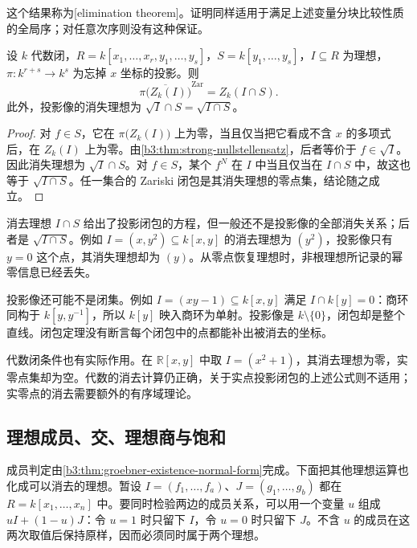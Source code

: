 这个结果称为[elimination theorem]。证明同样适用于满足上述变量分块比较性质的全局序；对任意次序则没有这种保证。

\begin{theorem}[投影的闭包]\label{b3:thm:elimination-projection-closure}
	设 \(k\) 代数闭，\(R=k[x_1,\ldots,x_r,y_1,\ldots,y_s]\)，\(S=k[y_1,\ldots,y_s]\)，\(I\subseteq R\) 为理想，\(\pi:k^{r+s}\to k^s\) 为忘掉 \(x\) 坐标的投影。则
	\[
		\overline{\pi\bigl(Z_k(I)\bigr)}^{\mathrm{Zar}}=Z_k(I\cap S).
	\]
	此外，投影像的消失理想为 \(\sqrt I\cap S=\sqrt{I\cap S}\)。
\end{theorem}
\begin{proof}
	对 \(f\in S\)，它在 \(\pi\bigl(Z_k(I)\bigr)\) 上为零，当且仅当把它看成不含 \(x\) 的多项式后，在 \(Z_k(I)\) 上为零。由\cref{b3:thm:strong-nullstellensatz}，后者等价于 \(f\in\sqrt I\)。因此消失理想为 \(\sqrt I\cap S\)。对 \(f\in S\)，某个 \(f^N\) 在 \(I\) 中当且仅当在 \(I\cap S\) 中，故这也等于 \(\sqrt{I\cap S}\)。任一集合的 Zariski 闭包是其消失理想的零点集，结论随之成立。
\end{proof}

消去理想 \(I\cap S\) 给出了投影闭包的方程，但一般还不是投影像的全部消失关系；后者是 \(\sqrt{I\cap S}\)。例如 \(I=(x,y^2)\subseteq k[x,y]\) 的消去理想为 \((y^2)\)，投影像只有 \(y=0\) 这个点，其消失理想却为 \((y)\)。从零点恢复理想时，非根理想所记录的幂零信息已经丢失。

投影像还可能不是闭集。例如 \(I=(xy-1)\subseteq k[x,y]\) 满足 \(I\cap k[y]=0\)：商环同构于 \(k[y,y^{-1}]\)，所以 \(k[y]\) 映入商环为单射。投影像是 \(k\setminus\{0\}\)，闭包却是整个直线。闭包定理没有断言每个闭包中的点都能补出被消去的坐标。

\ProseParagraphBreak
代数闭条件也有实际作用。在 \(\mathbb R[x,y]\) 中取 \(I=(x^2+1)\)，其消去理想为零，实零点集却为空。代数的消去计算仍正确，关于实点投影闭包的上述公式则不适用；实零点的消去需要额外的有序域理论。

\subsection{理想成员、交、理想商与饱和}
\label{b3:subsec:0803:02}

成员判定由\cref{b3:thm:groebner-existence-normal-form}完成。下面把其他理想运算也化成可以消去的理想。暂设 \(I=(f_1,\ldots,f_a)\)、\(J=(g_1,\ldots,g_b)\) 都在 \(R=k[x_1,\ldots,x_n]\) 中。要同时检验两边的成员关系，可以用一个变量 \(u\) 组成 \(uI+(1-u)J\)：令 \(u=1\) 时只留下 \(I\)，令 \(u=0\) 时只留下 \(J\)。不含 \(u\) 的成员在这两次取值后保持原样，因而必须同时属于两个理想。

